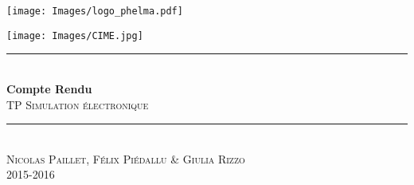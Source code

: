 \begin{titlepage}
    \vspace*{50px}
    \texttt{[image: Images/logo\_phelma.pdf]}
    \vspace*{-80px}
\begin{flushright}
    \texttt{[image: Images/CIME.jpg]}
\end{flushright}

\vspace*{2cm}

\begin{center}
\rule{\linewidth}{0.5mm}\\[0.4cm]
{\huge{\bfseries Compte Rendu}\\[0.4cm]
\textsc{TP Simulation électronique}\\[0.4cm]}
\rule{\linewidth}{0.5mm}\\[0.5cm]

\LARGE{\textsc{Nicolas Paillet, Félix Piédallu \& Giulia Rizzo}}\\[0.7cm]
\large{\textsc{2015-2016}}\\[2cm]

\Large{~}\\[1cm]
%
%

\end{center}
\end{titlepage}

\tableofcontents        %
\newpage
{}  %
